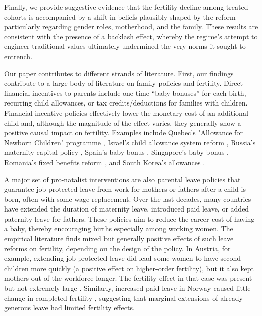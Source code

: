 \documentclass[a4paper,oneside,final,onecolumn,11pt,english]{article}
\begin{document}
Finally, we provide suggestive evidence that the fertility decline among treated cohorts is accompanied by a shift in beliefs plausibly shaped by the reform—particularly regarding gender roles, motherhood, and the family. These results are consistent with the presence of a backlash effect, whereby the regime’s attempt to engineer traditional values ultimately undermined the very norms it sought to entrench.



Our paper contributes to different strands of literature. First, our findings contribute to a large body of literature on family policies and fertility. Direct financial incentives to parents include one-time “baby bonuses” for each birth, recurring child allowances, or tax credits/deductions for families with children. Financial incentive policies effectively lower the monetary cost of an additional child and, although the magnitude of the effect varies, they generally show a positive causal impact on fertility. Examples include Quebec’s "Allowance for Newborn Children" programme \citep{milligan2005subsidizing}, Israel’s child allowance system reform \citep{cohen2013financial}, Russia's maternity capital policy \citep{slonimczyk2014assessing}, Spain’s baby bonus \citep{gonzalez2013effect, gonzalez2023cash}, Singapore’s baby bonus \citep{malak2019baby}, Romania's fixed benefits reform \citep{tudor2020financial}, and South Korea’s allowances \citep{kim2023paid}. 

A major set of pro-natalist interventions are also parental leave policies that guarantee job-protected leave from work for mothers or fathers after a child is born, often with some wage replacement. Over the last decades, many countries have extended the duration of maternity leave, introduced paid leave, or added paternity leave for fathers. These policies aim to reduce the career cost of having a baby, thereby encouraging births especially among working women. The empirical literature finds mixed but generally positive effects of such leave reforms on fertility, depending on the design of the policy. In Austria, for example, extending job-protected leave did lead some women to have second children more quickly (a positive effect on higher-order fertility), but it also kept mothers out of the workforce longer. The fertility effect in that case was present but not extremely large \citep{lalive2009does}. Similarly, increased paid leave in Norway caused little change in completed fertility \citep{dahl2016case}, suggesting that marginal extensions of already generous leave had limited fertility effects. 
\end{document}
